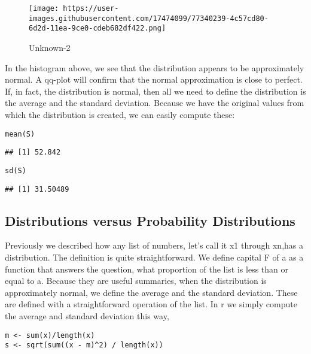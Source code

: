 \documentclass[
]{article}
\begin{document}
\begin{figure}
\centering
\texttt{[image: https://user-images.githubusercontent.com/17474099/77340239-4c57cd80-6d2d-11ea-9ce0-cdeb682df422.png]}
\caption{Unknown-2}
\end{figure}

In the histogram above, we see that the distribution appears to be
approximately normal. A qq-plot will confirm that the normal
approximation is close to perfect. If, in fact, the distribution is
normal, then all we need to define the distribution is the average and
the standard deviation. Because we have the original values from which
the distribution is created, we can easily compute these:

\begin{verbatim}
mean(S)
\end{verbatim}

\begin{verbatim}
## [1] 52.842
\end{verbatim}

\begin{verbatim}
sd(S)
\end{verbatim}

\begin{verbatim}
## [1] 31.50489
\end{verbatim}

\hypertarget{distributions-versus-probability-distributions}{%
\subsection{Distributions versus Probability
Distributions}\label{distributions-versus-probability-distributions}}

Previously we described how any list of numbers, let's call it x1
through xn,has a distribution. The definition is quite straightforward.
We define capital F of a as a function that answers the question, what
proportion of the list is less than or equal to a. Because they are
useful summaries, when the distribution is approximately normal, we
define the average and the standard deviation. These are defined with a
straightforward operation of the list. In r we simply compute the
average and standard deviation this way,

\begin{verbatim}
m <- sum(x)/length(x)
s <- sqrt(sum((x - m)^2) / length(x))
\end{verbatim}
\end{document}
